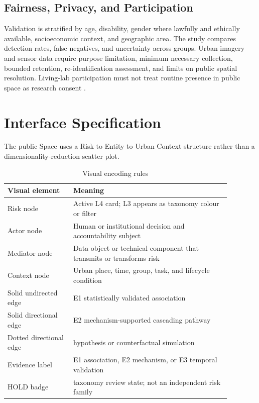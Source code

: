 \documentclass[11pt,a4paper]{article}
\begin{document}
\subsection{Fairness, Privacy, and Participation}

Validation is stratified by age, disability, gender where lawfully and ethically available, socioeconomic context, and geographic area. The study compares detection rates, false negatives, and uncertainty across groups. Urban imagery and sensor data require purpose limitation, minimum necessary collection, bounded retention, re-identification assessment, and limits on public spatial resolution. Living-lab participation must not treat routine presence in public space as research consent \cite{unhabitat2022,nesti2018}.

\section{Interface Specification}

The public Space uses a Risk to Entity to Urban Context structure rather than a dimensionality-reduction scatter plot.

\begin{table}[h]
\centering
\caption{Visual encoding rules}
\begin{tabular}{p{0.26\linewidth}p{0.62\linewidth}}
\toprule
Visual element & Meaning \\
\midrule
Risk node & Active L4 card; L3 appears as taxonomy colour or filter \\
Actor node & Human or institutional decision and accountability subject \\
Mediator node & Data object or technical component that transmits or transforms risk \\
Context node & Urban place, time, group, task, and lifecycle condition \\
Solid undirected edge & E1 statistically validated association \\
Solid directional edge & E2 mechanism-supported cascading pathway \\
Dotted directional edge & hypothesis or counterfactual simulation \\
Evidence label & E1 association, E2 mechanism, or E3 temporal validation \\
HOLD badge & taxonomy review state; not an independent risk family \\
\bottomrule
\end{tabular}
\end{table}
\end{document}
